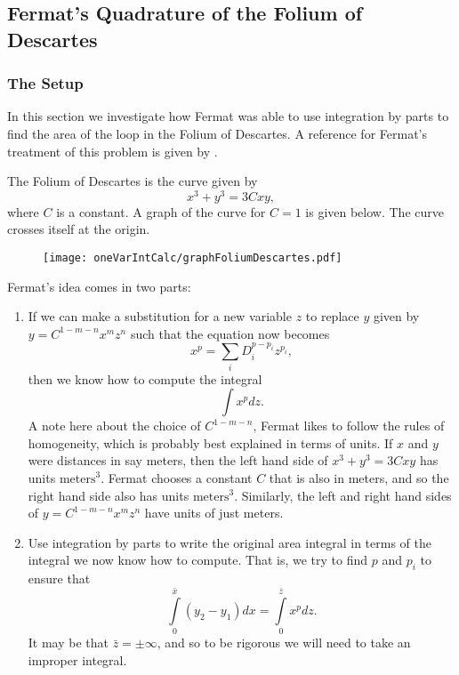 \subsection{Fermat's Quadrature of the Folium of Descartes}

\subsubsection*{The Setup}

In this section we investigate how Fermat was able to use integration by parts to find the area of the
loop in the Folium of Descartes. A reference for Fermat's treatment of this problem is given by \cite{fermatTreatise}. 

The Folium of Descartes is the curve given by
\begin{equation}
x^3 + y^3 = 3C xy,
\end{equation}
where \(C\) is a constant. A graph of the curve for \(C = 1\) is given below. The curve crosses itself
at the origin.

\begin{figure}[h]
\centering
\texttt{[image: oneVarIntCalc/graphFoliumDescartes.pdf]}
\end{figure}

Fermat's idea comes in two parts:
\begin{enumerate}
\item If we can make a substitution for a new variable \(z\) to replace \(y\) given by \(y = C^{1 - m - n} x^m z^n\) such that the equation
now becomes
\begin{equation}
x^p = \sum\limits_{i} D_i^{p - p_i} z^{p_i},
\end{equation}
then we know how to compute the integral
\begin{equation}
\int\limits x^p dz.
\end{equation}
A note here about the choice of \(C^{1 - m - n}\), Fermat likes to follow the rules of homogeneity, which is probably best explained
in terms of units. If \(x\) and \(y\) were distances in say meters, then the left hand side of \(x^3 + y^3 = 3Cxy\) has units 
\(\text{meters}^3\). Fermat chooses a constant \(C\) that is also in meters, and so the right hand side also has units
\(\text{meters}^3\). Similarly, the left and right hand sides of \(y = C^{1 - m -n} x^m z^n\) have units of just meters. 

\item Use integration by parts to write the original area integral in terms of the integral we now know how to compute. That is, 
we try to find \(p\) and \(p_i\) to ensure that
\begin{equation}
\int\limits_0^{\bar x} (y_2 - y_1) dx = \int\limits_0^{\bar z} x^p dz.
\end{equation}  
It may be that \(\bar z = \pm \infty\), and so to be rigorous we will need to take an improper integral.
\end{enumerate}

